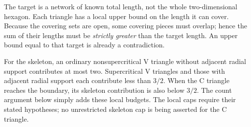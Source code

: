 The target is a network of known total length, not the whole two-dimensional
hexagon. Each triangle has a local upper bound on the length it can cover.
Because the covering sets are open, some covering pieces must overlap; hence
the sum of their lengths must be \emph{strictly greater} than the target
length. An upper bound equal to that target is already a contradiction.

For the skeleton, an ordinary nonsupercritical V triangle without adjacent
radial support contributes at most two. Supercritical V triangles and those
with adjacent radial support each contribute less than $3/2$. When the
C triangle reaches the boundary, its skeleton contribution is also below
$3/2$. The count argument below simply adds these local budgets. The local
caps require their stated hypotheses; no unrestricted skeleton cap is being
asserted for the C triangle.
